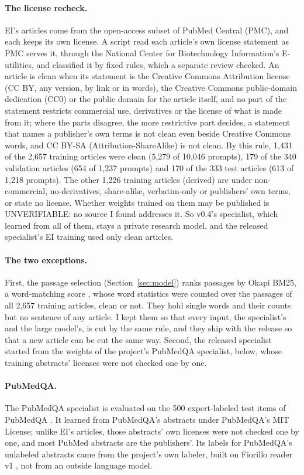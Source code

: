 \documentclass[11pt,letterpaper]{article}
\begin{document}
\paragraph{The license recheck.} EI's articles come from the open-access subset of PubMed Central (PMC), and each keeps its own license. A script read each article's own license statement as PMC serves it, through the National Center for Biotechnology Information's E-utilities, and classified it by fixed rules, which a separate review checked. An article is clean when its statement is the Creative Commons Attribution license (CC BY, any version, by link or in words), the Creative Commons public-domain dedication (CC0) or the public domain for the article itself, and no part of the statement restricts commercial use, derivatives or the license of what is made from it; where the parts disagree, the more restrictive part decides, a statement that names a publisher's own terms is not clean even beside Creative Commons words, and CC BY-SA (Attribution-ShareAlike) is not clean. By this rule, 1,431 of the 2,657 training articles were clean (5,279 of 10,046 prompts), 179 of the 340 validation articles (654 of 1,237 prompts) and 170 of the 333 test articles (613 of 1,218 prompts). The other 1,226 training articles (derived) are under non-commercial, no-derivatives, share-alike, verbatim-only or publishers' own terms, or state no license. Whether weights trained on them may be published is UNVERIFIABLE: no source I found addresses it. So v0.4's specialist, which learned from all of them, stays a private research model, and the released specialist's EI training used only clean articles.

\paragraph{The two exceptions.} First, the passage selection (Section~\ref{sec:model}) ranks passages by Okapi BM25, a word-matching score \citep{robertson2009}, whose word statistics were counted over the passages of all 2,657 training articles, clean or not. They hold single words and their counts but no sentence of any article. I kept them so that every input, the specialist's and the large model's, is cut by the same rule, and they ship with the release so that a new article can be cut the same way. Second, the released specialist started from the weights of the project's PubMedQA specialist, below, whose training abstracts' licenses were not checked one by one.

\paragraph{PubMedQA.} The PubMedQA specialist is evaluated on the 500 expert-labeled test items of PubMedQA \citep{jin2019}. It learned from PubMedQA's abstracts under PubMedQA's MIT License; unlike EI's articles, those abstracts' own licenses were not checked one by one, and most PubMed abstracts are the publishers'. Its labels for PubMedQA's unlabeled abstracts came from the project's own labeler, built on Fiorillo reader v1 \citep{reader1}, not from an outside language model.
\end{document}

